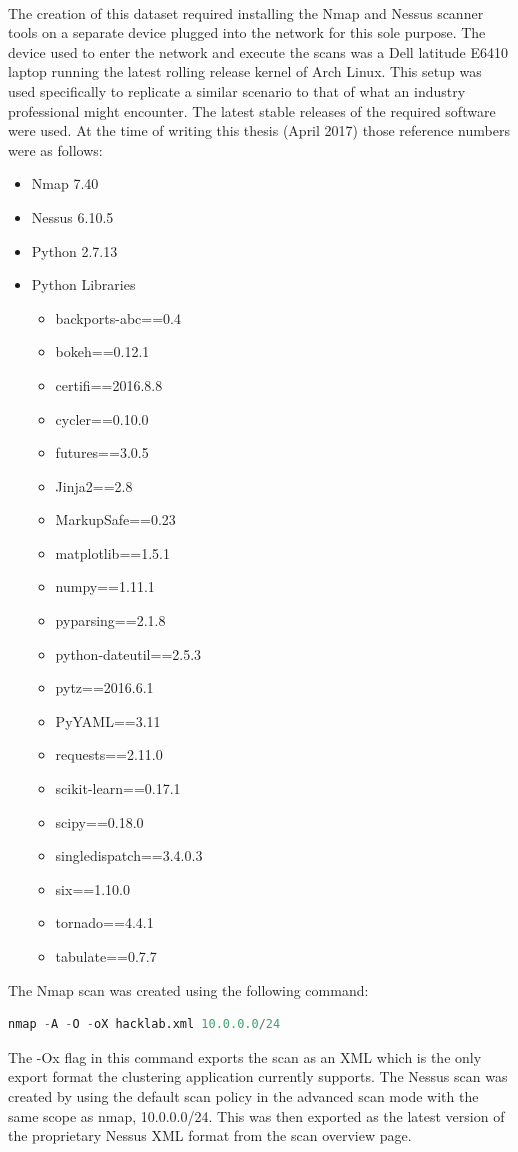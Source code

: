 \paragraph{}The creation of this dataset required installing the Nmap and Nessus scanner tools on a separate device plugged into the network for this sole purpose. The device used to enter the network and execute the scans was a Dell latitude E6410 laptop running the latest rolling release kernel of Arch Linux. This setup was used specifically to replicate a similar scenario to that of what an industry professional might encounter. The latest stable releases of the required software were used. At the time of writing this thesis (April 2017) those reference numbers were as follows: 
\begin{itemize}
\item Nmap 7.40
\item Nessus 6.10.5 
\item Python 2.7.13
\item Python Libraries
\begin{itemize}
\item backports-abc==0.4
\item bokeh==0.12.1
\item certifi==2016.8.8
\item cycler==0.10.0
\item futures==3.0.5
\item Jinja2==2.8
\item MarkupSafe==0.23
\item matplotlib==1.5.1
\item numpy==1.11.1
\item pyparsing==2.1.8
\item python-dateutil==2.5.3
\item pytz==2016.6.1
\item PyYAML==3.11
\item requests==2.11.0
\item scikit-learn==0.17.1
\item scipy==0.18.0
\item singledispatch==3.4.0.3
\item six==1.10.0
\item tornado==4.4.1
\item tabulate==0.7.7
\end{itemize}
\end{itemize}

The Nmap scan was created using the following command: 
\begin{lstlisting}[language=python]
nmap -A -O -oX hacklab.xml 10.0.0.0/24
\end{lstlisting}
The -Ox flag in this command exports the scan as an XML which is the only export format the clustering application currently supports.\linebreak
The Nessus scan was created by using the default scan policy in the advanced scan mode with the same scope as nmap, 10.0.0.0/24. This was then exported as the latest version of the proprietary Nessus XML format from the scan overview page.

